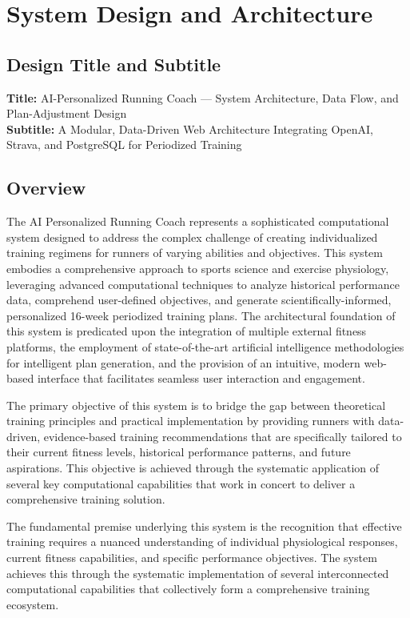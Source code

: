 \chapter{System Design and Architecture}

\section*{Design Title and Subtitle}
\textbf{Title:} AI-Personalized Running Coach — System Architecture, Data Flow, and Plan-Adjustment Design\\
\textbf{Subtitle:} A Modular, Data-Driven Web Architecture Integrating OpenAI, Strava, and PostgreSQL for Periodized Training


\section{Overview}

The AI Personalized Running Coach represents a sophisticated computational system designed to address the complex challenge of creating individualized training regimens for runners of varying abilities and objectives. This system embodies a comprehensive approach to sports science and exercise physiology, leveraging advanced computational techniques to analyze historical performance data, comprehend user-defined objectives, and generate scientifically-informed, personalized 16-week periodized training plans. The architectural foundation of this system is predicated upon the integration of multiple external fitness platforms, the employment of state-of-the-art artificial intelligence methodologies for intelligent plan generation, and the provision of an intuitive, modern web-based interface that facilitates seamless user interaction and engagement.

The primary objective of this system is to bridge the gap between theoretical training principles and practical implementation by providing runners with data-driven, evidence-based training recommendations that are specifically tailored to their current fitness levels, historical performance patterns, and future aspirations. This objective is achieved through the systematic application of several key computational capabilities that work in concert to deliver a comprehensive training solution.

The fundamental premise underlying this system is the recognition that effective training requires a nuanced understanding of individual physiological responses, current fitness capabilities, and specific performance objectives. The system achieves this through the systematic implementation of several interconnected computational capabilities that collectively form a comprehensive training ecosystem.

